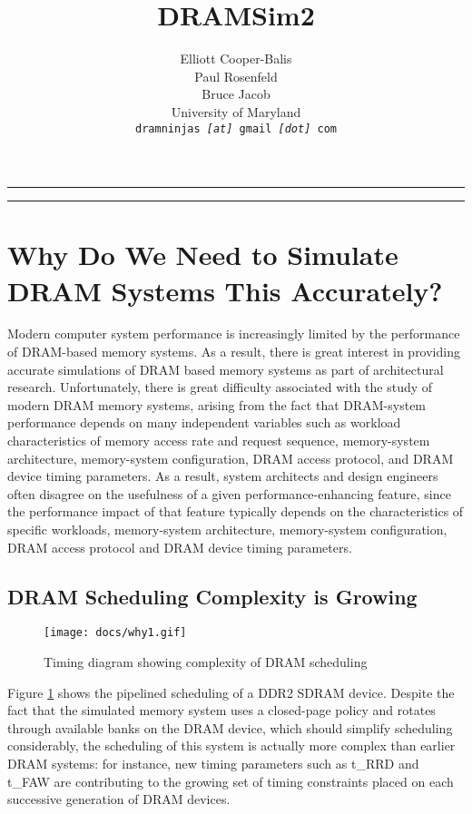 \documentclass[11pt]{article}
\newcommand{\HRule}{\rule{\linewidth}{0.5mm}}
\begin{document}
\title{DRAMSim2}
\author{Elliott Cooper-Balis \\
			Paul Rosenfeld \\
			Bruce Jacob \\
			University of Maryland \\
			\texttt{\footnotesize dramninjas \textit{[at]} gmail \textit{[dot]} com}
}
\date{}
\maketitle
\HRule
\tableofcontents
\HRule
{}
\section{Why Do We Need to Simulate DRAM Systems This Accurately?}
Modern computer system performance is increasingly limited
by the performance of DRAM-based memory systems. As a result, there is great
interest in providing accurate simulations of DRAM based memory systems as part
of architectural research. Unfortunately, there is great difficulty associated
with the study of modern DRAM memory systems, arising from
the fact that DRAM-system performance depends on many
independent variables such as workload characteristics of memory access rate
and request sequence, memory-system architecture, memory-system configuration, DRAM
access protocol, and DRAM device timing parameters. As a result, system
architects and design engineers often disagree on the usefulness of a given
performance-enhancing feature, since the performance impact of that feature typically 
depends on the characteristics of specific workloads, memory-system architecture, 
memory-system configuration, DRAM access protocol and DRAM device timing parameters. 
\subsection{DRAM Scheduling Complexity is Growing}

\begin{figure}[h]
\begin{center}
\texttt{[image: docs/why1.gif]}
\caption{Timing diagram showing complexity of DRAM scheduling}
\label{timingcomplex}
\end{center}
\end{figure}
Figure \ref{timingcomplex} shows the pipelined scheduling of a DDR2 SDRAM device. Despite
the fact that the simulated memory system uses a closed-page policy and 
rotates through available banks on the DRAM device, which should simplify
scheduling considerably, the scheduling of this system is actually more
complex than earlier DRAM systems: for instance, new timing parameters
such as t_{RRD} and t_{FAW} are contributing to the growing
set of timing constraints placed on each successive generation of DRAM 
devices.
\end{document}
